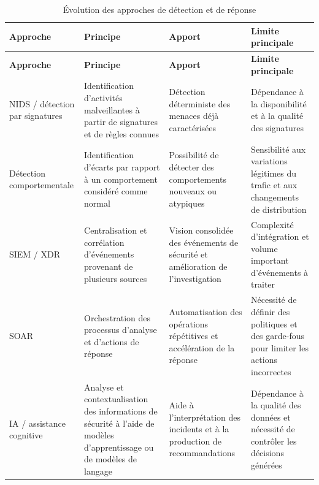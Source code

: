 \renewcommand{\arraystretch}{1.5}
\begin{xltabular}{\textwidth}{|>{\raggedright\arraybackslash}X
                              |>{\raggedright\arraybackslash}X
                              |>{\raggedright\arraybackslash}X
                              |>{\raggedright\arraybackslash}X|}
\caption{Évolution des approches de détection et de réponse}
\label{tab:evolution_detection_reponse} \\
\hline
{}
\textbf{Approche} & \textbf{Principe} & \textbf{Apport} & \textbf{Limite principale} \\ \hline
\endfirsthead

\hline
{}
\textbf{Approche} & \textbf{Principe} & \textbf{Apport} & \textbf{Limite principale} \\ \hline
\endhead

NIDS / détection par signatures &
Identification d'activités malveillantes à partir de signatures et de règles connues &
Détection déterministe des menaces déjà caractérisées &
Dépendance à la disponibilité et à la qualité des signatures \\
\hline

Détection comportementale &
Identification d'écarts par rapport à un comportement considéré comme normal &
Possibilité de détecter des comportements nouveaux ou atypiques &
Sensibilité aux variations légitimes du trafic et aux changements de distribution \\
\hline

SIEM / XDR &
Centralisation et corrélation d'événements provenant de plusieurs sources &
Vision consolidée des événements de sécurité et amélioration de l'investigation &
Complexité d'intégration et volume important d'événements à traiter \\
\hline

SOAR &
Orchestration des processus d'analyse et d'actions de réponse &
Automatisation des opérations répétitives et accélération de la réponse &
Nécessité de définir des politiques et des garde-fous pour limiter les actions incorrectes \\
\hline

IA / assistance cognitive &
Analyse et contextualisation des informations de sécurité à l'aide de modèles d'apprentissage ou de modèles de langage &
Aide à l'interprétation des incidents et à la production de recommandations &
Dépendance à la qualité des données et nécessité de contrôler les décisions générées \\
\hline
\end{xltabular}


